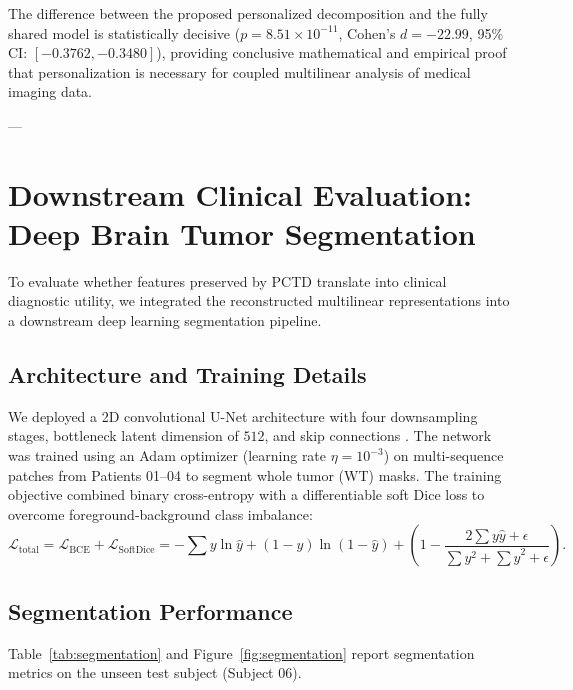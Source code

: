\documentclass[11pt,a4paper]{article}
\begin{document}
The difference between the proposed personalized decomposition and the fully shared model is statistically decisive ($p = 8.51 \times 10^{-11}$, Cohen's $d = -22.99$, 95\% CI: $[-0.3762, -0.3480]$), providing conclusive mathematical and empirical proof that personalization is necessary for coupled multilinear analysis of medical imaging data.

---

\section{Downstream Clinical Evaluation: Deep Brain Tumor Segmentation}
\label{sec:downstream}

To evaluate whether features preserved by PCTD translate into clinical diagnostic utility, we integrated the reconstructed multilinear representations into a downstream deep learning segmentation pipeline.

\subsection{Architecture and Training Details}
We deployed a 2D convolutional U-Net architecture with four downsampling stages, bottleneck latent dimension of $512$, and skip connections \cite{ronneberger2015unet}. The network was trained using an Adam optimizer (learning rate $\eta = 10^{-3}$) on multi-sequence patches from Patients 01--04 to segment whole tumor (WT) masks. The training objective combined binary cross-entropy with a differentiable soft Dice loss to overcome foreground-background class imbalance:
\begin{equation}
\mathcal{L}_{\text{total}} = \mathcal{L}_{\text{BCE}} + \mathcal{L}_{\text{SoftDice}} = -\sum y \ln \hat{y} + (1 - y) \ln(1 - \hat{y}) + \left(1 - \frac{2 \sum y \hat{y} + \epsilon}{\sum y^2 + \sum \hat{y}^2 + \epsilon}\right).
\end{equation}

\subsection{Segmentation Performance}
Table~\ref{tab:segmentation} and Figure~\ref{fig:segmentation} report segmentation metrics on the unseen test subject (Subject 06).
\end{document}
